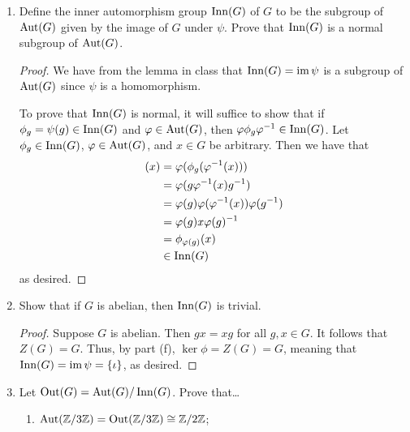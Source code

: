 \documentclass[../psets.tex]{subfiles}
\begin{document}
\begin{enumerate}
\begin{enumerate}
\begin{proof}
            To prove that $\ker\psi=Z(G)$, we will use a bidirectional inclusion argument.\par
            Suppose first that $g\in\ker\psi$. Then $\iota=\psi(g)=\phi_g$. It follows that $gxg^{-1}=\phi_g(x)=\iota(x)=x$ for all $x\in X$, but this directly implies that $gx=xg$ for all $x\in G$.\par
            The proof is symmetric in the reverse direction.
        \end{proof}
        \item Define the inner automorphism group $\operatorname{Inn}(G)$ of $G$ to be the subgroup of $\operatorname{Aut}(G)$ given by the image of $G$ under $\psi$. Prove that $\operatorname{Inn}(G)$ is a normal subgroup of $\operatorname{Aut}(G)$.
        \begin{proof}
            We have from the lemma in class that $\operatorname{Inn}(G)=\operatorname{im}\psi$ is a subgroup of $\operatorname{Aut}(G)$ since $\psi$ is a homomorphism.\par
            To prove that $\operatorname{Inn}(G)$ is normal, it will suffice to show that if $\phi_g=\psi(g)\in\operatorname{Inn}(G)$ and $\varphi\in\operatorname{Aut}(G)$, then $\varphi\phi_g\varphi^{-1}\in\operatorname{Inn}(G)$. Let $\phi_g\in\operatorname{Inn}(G)$, $\varphi\in\operatorname{Aut}(G)$, and $x\in G$ be arbitrary. Then we have that
            \begin{align*}
                [\varphi\phi_g\varphi^{-1}](x) &= \varphi(\phi_g(\varphi^{-1}(x)))\\
                &= \varphi(g\varphi^{-1}(x)g^{-1})\\
                &= \varphi(g)\varphi(\varphi^{-1}(x))\varphi(g^{-1})\\
                &= \varphi(g)x\varphi(g)^{-1}\\
                &= \phi_{\varphi(g)}(x)\\
                &\in \Inn(G)
            \end{align*}
            as desired.
        \end{proof}
        \item Show that if $G$ is abelian, then $\operatorname{Inn}(G)$ is trivial.
        \begin{proof}
            Suppose $G$ is abelian. Then $gx=xg$ for all $g,x\in G$. It follows that $Z(G)=G$. Thus, by part (f), $\ker\phi=Z(G)=G$, meaning that $\operatorname{Inn}(G)=\operatorname{im}\psi=\{\iota\}$, as desired.
        \end{proof}
        \item Let $\operatorname{Out}(G)=\operatorname{Aut}(G)/\operatorname{Inn}(G)$. Prove that\dots
        \begin{enumerate}
            \item $\operatorname{Aut}(\mathbb{Z}/3\mathbb{Z})=\operatorname{Out}(\mathbb{Z}/3\mathbb{Z})\cong\mathbb{Z}/2\mathbb{Z}$;

\end{enumerate}
\end{enumerate}
\end{enumerate}
\end{document}
